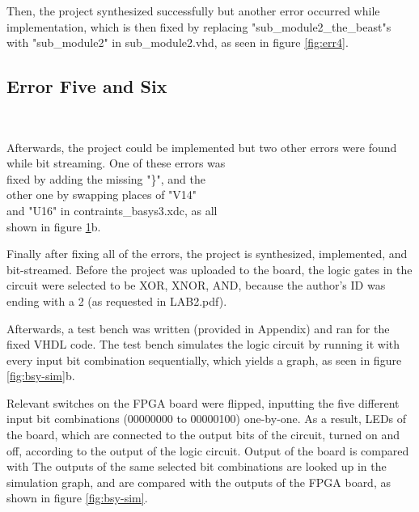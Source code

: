 \documentclass[a4paper, 12pt]{article}
\begin{document}
Then, the project synthesized successfully but another error occurred while implementation, which is then fixed by replacing "sub\_module2\_the\_beast"s with "sub\_module2" in sub\_module2.vhd, as seen in figure \ref{fig:err4}.

\subsection{Error Five and Six}

\begin{figure}
\vspace{-5cm}
	\centering
	\\
	\caption{}
	\label{fig:err5}
\end{figure}

Afterwards, the project could be implemented but two other errors were found while bit streaming.
One of these errors was \\ fixed by adding the missing "\}", and the \\ other one by swapping places of "V14" \\ and "U16" in contraints\_basys3.xdc, as all \\ shown in figure \ref{fig:err5}b.

Finally after fixing all of the errors, the project is synthesized, implemented, and bit-streamed.
Before the project was uploaded to the board, the logic gates in the circuit were selected to be XOR, XNOR, AND, because the author's ID was ending with a 2 (as requested in LAB2.pdf).

Afterwards, a test bench was written (provided in Appendix) and ran for the fixed VHDL code.
The test bench simulates the logic circuit by running it with every input bit combination sequentially, which yields a graph, as seen in figure \ref{fig:bsy-sim}b.

Relevant switches on the FPGA board were flipped, inputting the five different input bit combinations (00000000 to 00000100) one-by-one.
As a result, LEDs of the board, which are connected to the output bits of the circuit, turned on and off, according to the output of the logic circuit.
Output of the board is compared with 
The outputs of the same selected bit combinations are looked up in the simulation graph, and are compared with the outputs of the FPGA board, as shown in figure \ref{fig:bsy-sim}.
\end{document}
